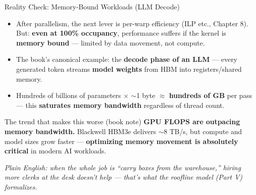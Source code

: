 \documentclass[aspectratio=169]{beamer}
\newcommand{\kw}[1]{\textbf{\textcolor{kwblue}{#1}}}
\newcommand{\pe}[1]{{\footnotesize\itshape Plain English: #1}}
\begin{document}
\begin{frame}{Reality Check: Memory-Bound Workloads (LLM Decode)}
  \begin{itemize}
    \item After parallelism, the next lever is per-warp efficiency (ILP etc., Chapter 8). But:
          \kw{even at 100\% occupancy}, performance suffers if the kernel is
          \kw{memory bound} --- limited by data movement, not compute.
    \item The book's canonical example: the \kw{decode phase of an LLM} ---
          every generated token streams \kw{model weights} from HBM into registers/shared memory.
    \item Hundreds of billions of parameters $\times$ $\sim$1 byte $\approx$
          \kw{hundreds of GB} per pass --- this \kw{saturates memory bandwidth} regardless
          of thread count.
  \end{itemize}
  \begin{block}{The trend that makes this worse (book note)}
    \kw{GPU FLOPS are outpacing memory bandwidth.} Blackwell HBM3e delivers $\sim$8 TB/s,
    but compute and model sizes grow faster --- \kw{optimizing memory movement is absolutely
    critical} in modern AI workloads.
  \end{block}
  \medskip
  \pe{when the whole job is ``carry boxes from the warehouse,'' hiring more clerks at the desk doesn't help --- that's what the roofline model (Part V) formalizes.}
\end{frame}
\end{document}
